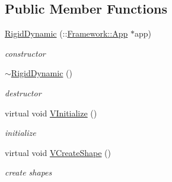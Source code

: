 \subsection*{Public Member Functions}
\begin{DoxyCompactItemize}
\item 
\hypertarget{classContent_1_1Actor_1_1RigidDynamic_a32be4a55914563a3182f803b9c9d34f1}{
\hyperlink{classContent_1_1Actor_1_1RigidDynamic_a32be4a55914563a3182f803b9c9d34f1}{RigidDynamic} (::\hyperlink{classFramework_1_1App}{Framework::App} $\ast$app)}
\label{classContent_1_1Actor_1_1RigidDynamic_a32be4a55914563a3182f803b9c9d34f1}

\begin{DoxyCompactList}\small\item\em constructor \item\end{DoxyCompactList}\item 
\hypertarget{classContent_1_1Actor_1_1RigidDynamic_a4bef76fc30923cbbe133e39e987e7dc1}{
\hyperlink{classContent_1_1Actor_1_1RigidDynamic_a4bef76fc30923cbbe133e39e987e7dc1}{$\sim$RigidDynamic} ()}
\label{classContent_1_1Actor_1_1RigidDynamic_a4bef76fc30923cbbe133e39e987e7dc1}

\begin{DoxyCompactList}\small\item\em destructor \item\end{DoxyCompactList}\item 
\hypertarget{classContent_1_1Actor_1_1RigidDynamic_a67496d59ae953146b4f73b2cb5b41d36}{
virtual void \hyperlink{classContent_1_1Actor_1_1RigidDynamic_a67496d59ae953146b4f73b2cb5b41d36}{VInitialize} ()}
\label{classContent_1_1Actor_1_1RigidDynamic_a67496d59ae953146b4f73b2cb5b41d36}

\begin{DoxyCompactList}\small\item\em initialize \item\end{DoxyCompactList}\item 
\hypertarget{classContent_1_1Actor_1_1RigidDynamic_af37e12b10f1bb79521b6f5c37c69c6ba}{
virtual void \hyperlink{classContent_1_1Actor_1_1RigidDynamic_af37e12b10f1bb79521b6f5c37c69c6ba}{VCreateShape} ()}
\label{classContent_1_1Actor_1_1RigidDynamic_af37e12b10f1bb79521b6f5c37c69c6ba}

\begin{DoxyCompactList}\small\item\em create shapes \item\end{DoxyCompactList}\end{DoxyCompactItemize}


